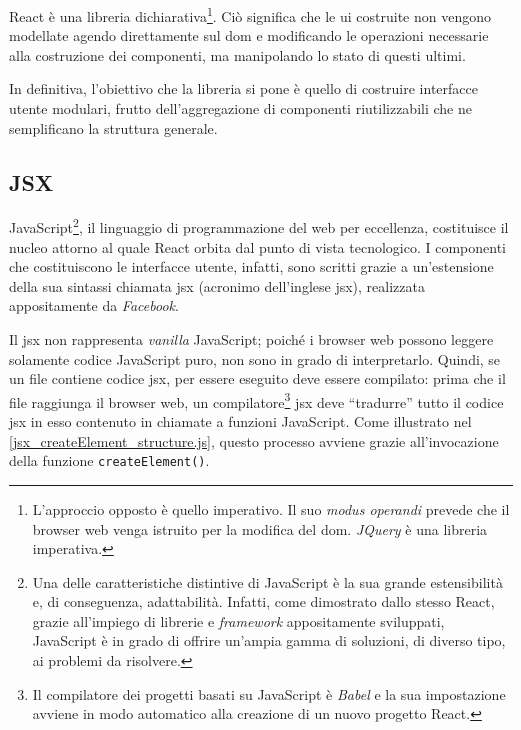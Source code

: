 React è una libreria dichiarativa\footnote{L'approccio opposto è quello imperativo. Il suo \textit{modus operandi} prevede che il browser web venga istruito per la modifica del \gls{dom}. \textit{JQuery} è una libreria imperativa.}. Ciò significa che le \acrshort{ui} costruite non vengono modellate agendo direttamente sul \gls{dom} e modificando le operazioni necessarie alla costruzione dei componenti, ma manipolando lo stato di questi ultimi.

In definitiva, l'obiettivo che la libreria si pone è quello di costruire interfacce utente modulari, frutto dell'aggregazione di componenti riutilizzabili che ne semplificano la struttura generale.

\subsection{JSX} 
\label{subsec:JSX}
JavaScript\footnote{Una delle caratteristiche distintive di JavaScript è la sua grande estensibilità e, di conseguenza, adattabilità. Infatti, come dimostrato dallo stesso React, grazie all'impiego di librerie e \textit{framework} appositamente sviluppati, JavaScript è in grado di offrire un'ampia gamma di soluzioni, di diverso tipo, ai problemi da risolvere.}, il linguaggio di programmazione del web per eccellenza, costituisce il nucleo attorno al quale React orbita dal punto di vista tecnologico. I componenti che costituiscono le interfacce utente, infatti, sono scritti grazie a un'estensione della sua sintassi chiamata \acrshort{jsx} (acronimo dell'inglese \acrlong{jsx}), realizzata appositamente da \textit{Facebook}.

Il \acrshort{jsx} non rappresenta \textit{vanilla} JavaScript; poiché i browser web possono leggere solamente codice JavaScript puro, non sono in grado di interpretarlo. Quindi, se un file contiene codice \acrshort{jsx}, per essere eseguito deve essere compilato: prima che il file raggiunga il browser web, un compilatore\footnote{Il compilatore dei progetti basati su JavaScript è \textit{Babel} e la sua impostazione avviene in modo automatico alla creazione di un nuovo progetto React.} \acrshort{jsx} deve “tradurre” tutto il codice \acrshort{jsx} in esso contenuto in chiamate a funzioni JavaScript. Come illustrato nel \autoref{jsx_createElement_structure.js}, questo processo avviene grazie all'invocazione della funzione \texttt{createElement()}. 

